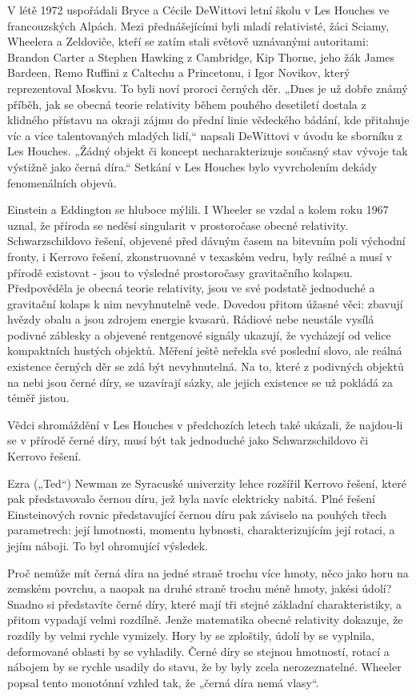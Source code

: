   V létě 1972 uspořádali Bryce a Cécile DeWittovi letní školu v Les Houches ve francouzských Alpách.
  Mezi přednášejícími byli mladí relativisté, žáci Sciamy, Wheelera a Zeldoviče, kteří se zatím
  stali světově uznávanými autoritami: Brandon Carter a Stephen Hawking z Cambridge, Kip Thorne,
  jeho žák James Bardeen, Remo Ruffini z Caltechu a Princetonu, i Igor Novikov, který reprezentoval
  Moskvu. To byli noví proroci černých děr. „Dnes je už dobře známý příběh, jak se obecná teorie
  relativity během pouhého desetiletí dostala z klidného přístavu na okraji zájmu do přední linie
  vědeckého bádání, kde přitahuje víc a více talentovaných mladých lidí,“ napsali DeWittovi v úvodu
  ke sborníku z Les Houches. „Žádný objekt či koncept necharakterizuje současný stav vývoje tak
  výstižně jako černá díra.“ Setkání v Les Houches bylo vyvrcholením dekády fenomenálních objevů. 

  Einstein a Eddington se hluboce mýlili. I Wheeler se vzdal a kolem roku 1967 uznal, že příroda se
  neděsí singularit v prostoročase obecné relativity. Schwarzschildovo řešení, objevené před dávným
  časem na bitevním poli východní fronty, i Kerrovo řešení, zkonstruované v texaském vedru, byly
  reálné a musí v přírodě existovat - jsou to výsledné prostoročasy gravitačního kolapsu.
  Předpověděla je obecná teorie relativity, jsou ve své podstatě jednoduché a gravitační kolaps k
  nim nevyhnutelně vede. Dovedou přitom úžasné věci: zbavují hvězdy obalu a jsou zdrojem energie
  kvasarů. Rádiové nebe neustále vysílá podivné záblesky a objevené rentgenové signály ukazují, že
  vycházejí od velice kompaktních hustých objektů. Měření ještě neřekla své poslední slovo, ale
  reálná existence černých děr se zdá být nevyhnutelná. Na to, které z podivných objektů na nebi
  jsou černé díry, se uzavírají sázky, ale jejich existence se už pokládá za téměř jistou. 

  Vědci shromáždění v Les Houches v předchozích letech také ukázali, že najdou-li se v přírodě černé
  díry, musí být tak jednoduché jako Schwarzschildovo či Kerrovo řešení. 

  Ezra („Ted“) Newman ze Syracuské univerzity lehce rozšířil Kerrovo řešení, které pak představovalo
  černou díru, jež byla navíc elektricky nabitá. Plné řešení Einsteinových rovnic představující
  černou díru pak záviselo na pouhých třech parametrech: její hmotnosti, momentu hybnosti,
  charakterizujícím její rotaci, a jejím náboji. To byl ohromující výsledek. 

  Proč nemůže mít černá díra na jedné straně trochu více hmoty, něco jako horu na zemském povrchu, a
  naopak na druhé straně trochu méně hmoty, jakési údolí? Snadno si představíte černé díry, které
  mají tři stejné základní charakteristiky, a přitom vypadají velmi rozdílně. Jenže matematika
  obecné relativity dokazuje, že rozdíly by velmi rychle vymizely. Hory by se zploštily, údolí by se
  vyplnila, deformované oblasti by se vyhladily. Černé díry se stejnou hmotností, rotací a nábojem
  by se rychle usadily do stavu, že by byly zcela nerozeznatelné. Wheeler popsal tento monotónní
  vzhled tak, že „černá díra nemá vlasy“. 

